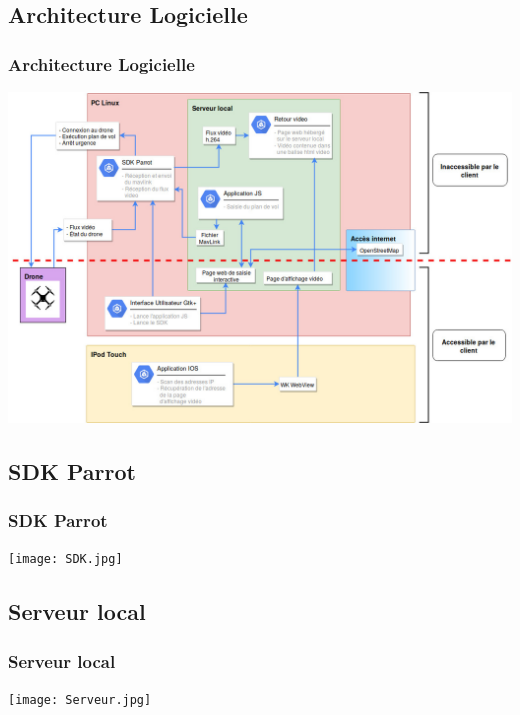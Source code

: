 \documentclass{beamer}
\begin{document}
	\begin{frame}
	\section{Architecture Logicielle}
		\begin{center}
		\frametitle{Architecture Logicielle}
       
        \includegraphics[scale=0.3]{Architecture_logicielle_v2.jpg}
		\end{center}
	\end{frame}
	
	\begin{frame}
	\section{SDK Parrot}
		\begin{center}
		\frametitle{SDK Parrot}
		\texttt{[image: SDK.jpg]}
		\end{center}	
	\end{frame}
	
	\begin{frame}
	\section{Serveur local}
		\begin{center}
		\frametitle{Serveur local}
        \texttt{[image: Serveur.jpg]}
		\end{center}
	\end{frame}
	
\end{document}
